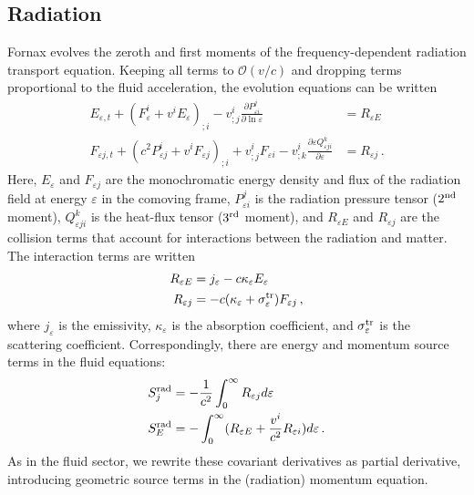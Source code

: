 \documentclass[iop]{emulateapj}
\begin{document}
\subsection{Radiation}
Fornax evolves the zeroth and first moments of the frequency-dependent radiation transport equation.  Keeping all terms to $\mathcal{O}(v/c)$ and dropping terms proportional to the fluid acceleration, the evolution equations can be written
\begin{align}
E_{\varepsilon,t} + (F_{\varepsilon}^i + v^i E_{\varepsilon})_{;i} - v^i_{;j}\frac{\partial P_{\varepsilon i}^j}{\partial\ln\varepsilon} &= R_{\varepsilon E} \label{eq:rad_E} \\ 
F_{\varepsilon j,t} + (c^2 P_{\varepsilon j}^i + v^i F_{\varepsilon j})_{;i} + v^i_{;j} F_{\varepsilon i}  - v^i_{;k} \frac{\partial \varepsilon Q^k_{\varepsilon ji}}{\partial\varepsilon}  &= R_{\varepsilon j}\,.
\end{align}
Here, $E_{\varepsilon}$ and $F_{\varepsilon j}$ are the monochromatic energy density and flux of the radiation field at energy $\varepsilon$ in the comoving frame, $P^j_{\varepsilon i}$ is the radiation pressure tensor ($2^{\rm nd}$ moment), $Q^k_{\varepsilon j i}$ is the heat-flux tensor ($3^{\rm rd}$ moment), and $R_{\varepsilon E}$ and $R_{\varepsilon j}$ are the collision terms that account for interactions between the radiation and matter.  The interaction terms are written
\begin{align}
R_{\varepsilon E} &= j_\varepsilon - c \kappa_\varepsilon E_\varepsilon \\
R_{\varepsilon j} &= -c(\kappa_\varepsilon + \sigma^{\rm tr}_\varepsilon) F_{\varepsilon j}\,, \label{eq:rad_mom_src}
\end{align}
where $j_\varepsilon$ is the emissivity, $\kappa_\varepsilon$ is the absorption coefficient, and $\sigma^{\rm tr}_\varepsilon$ is the scattering coefficient.  Correspondingly, there are energy and momentum source terms in the fluid equations:
\begin{align}
S^{\rm{rad}}_j &= -\frac{1}{c^2} \int_0^\infty R_{\varepsilon j} d\varepsilon \label{eq:radgas_E} \\ 
S^{\rm{rad}}_E &= -\int_0^\infty (R_{\varepsilon E} + \frac{v^i}{c^2} R_{\varepsilon i}) d\varepsilon\,. \label{eq:radgas_mom}
\end{align}
As in the fluid sector, we rewrite these covariant derivatives as partial derivative, introducing geometric source terms in the (radiation) momentum equation.
\end{document}
